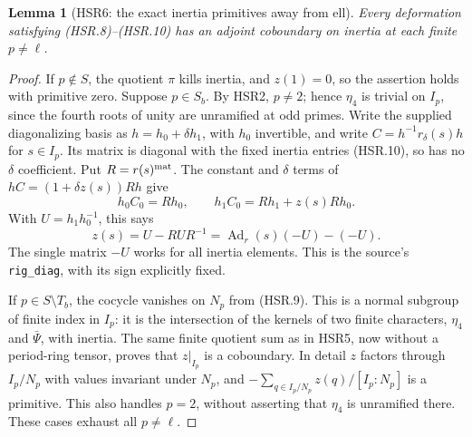 \documentclass[11pt,a4paper]{article}
\numberwithin{equation}{section}
\newtheorem{lemma}[theorem]{Lemma}
\theoremstyle{remark}\newtheorem{remark}[theorem]{Remark}
\begin{document}
\begin{lemma}[HSR6: the exact inertia primitives away from ell]
\label{claim:HSR6}
Every deformation satisfying (HSR.8)--(HSR.10) has an adjoint
coboundary on inertia at each finite $p\ne\ell$.
\end{lemma}
\begin{proof}
If $p\notin S$, the quotient $\pi$ kills inertia, and
$z(1)=0$, so the assertion holds with primitive zero.
Suppose $p\in S_b$.  By HSR2, $p\ne2$; hence $\eta_4$ is
trivial on $I_p$, since the fourth roots of unity are unramified
at odd primes.  Write the supplied diagonalizing basis as
$h=h_0+\delta h_1$, with $h_0$ invertible, and write
$C=h^{-1}r_\delta(s)h$ for $s\in I_p$.  Its matrix is diagonal
with the fixed inertia entries (HSR.10), so has no $\delta$
coefficient.  Put $R=r(s)^{\rm mat}$.  The constant and
$\delta$ terms of $hC=(1+\delta z(s))Rh$ give
\[
 h_0C_0=Rh_0,\qquad
 h_1C_0=Rh_1+z(s)Rh_0.
\]
With $U=h_1h_0^{-1}$, this says
\[
 z(s)=U-RUR^{-1}
     =\operatorname{Ad}_r(s)(-U)-(-U).
 \tag{HSR.20}
\]
The single matrix $-U$ works for all inertia elements.  This is
the source's \texttt{rig\_\allowbreak diag}, with its sign explicitly fixed.

If $p\in S\setminus T_b$, the cocycle vanishes on $N_p$ from
(HSR.9).  This is a normal subgroup of finite index in $I_p$:
it is the intersection of the kernels of two finite characters,
$\eta_4$ and $\bar\Psi$, with inertia.  The same finite quotient
sum as in HSR5, now without a period-ring tensor, proves that
$z|_{I_p}$ is a coboundary.  In detail $z$ factors through
$I_p/N_p$ with values invariant under $N_p$, and
$-\sum_{q\in I_p/N_p}z(q)/[I_p:N_p]$ is a primitive.  This
also handles $p=2$, without asserting that $\eta_4$ is
unramified there.  These cases exhaust all $p\ne\ell$.
\end{proof}
\end{document}
